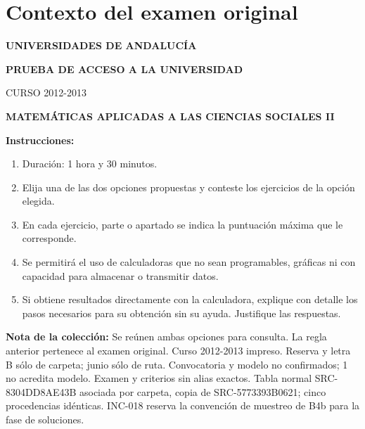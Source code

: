 \section*{Contexto del examen original}
\textbf{UNIVERSIDADES DE ANDALUCÍA}\par
\textbf{PRUEBA DE ACCESO A LA UNIVERSIDAD}\par
CURSO 2012-2013\par
\textbf{MATEMÁTICAS APLICADAS A LAS CIENCIAS SOCIALES II}

\textbf{Instrucciones:}
\begin{enumerate}[label=\textbf{\alph*)}]
  \item Duración: 1 hora y 30 minutos.
  \item Elija una de las dos opciones propuestas y conteste los ejercicios de la opción elegida.
  \item En cada ejercicio, parte o apartado se indica la puntuación máxima que le corresponde.
  \item Se permitirá el uso de calculadoras que no sean programables, gráficas ni con capacidad para almacenar o transmitir datos.
  \item Si obtiene resultados directamente con la calculadora, explique con detalle los pasos necesarios para su obtención sin su ayuda. Justifique las respuestas.
\end{enumerate}
\noindent\textbf{Nota de la colección:} Se reúnen ambas opciones para consulta. La regla anterior pertenece al examen original. Curso 2012-2013 impreso. Reserva y letra B sólo de carpeta; junio sólo de ruta. Convocatoria y modelo no confirmados; 1 no acredita modelo. Examen y criterios sin alias exactos. Tabla normal SRC-8304DD8AE43B asociada por carpeta, copia de SRC-5773393B0621; cinco procedencias idénticas. INC-018 reserva la convención de muestreo de B4b para la fase de soluciones.
\par\medskip

